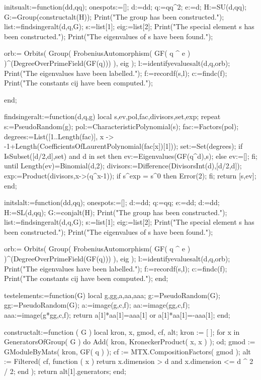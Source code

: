 initsualt:=function(dd,qq);
onespots:=[];
d:=dd;
q:=qq^2;
e:=d;
H:=SU(d,qq);
G:=Group(constructalt(H));
Print("The group has been constructed.\n");
list:=findsingeralt(d,q,G);
s:=list[1]; eig:=list[2];
Print("The special element s has been constructed.\n");
Print("The eigenvalues of s have been found.\n");

orb:= Orbits( Group( FrobeniusAutomorphism( GF( q ^ e ) )^(DegreeOverPrimeField(GF(q))) ), eig );
l:=identifyevaluesalt(d,q,orb);
Print("The eigenvalues have been labelled.\n");
f:=recordf(s,l);
c:=findc(f);
Print("The constants cij have been computed.");

end;

findsingeralt:=function(d,q,g)
local s,ev,pol,fac,divisors,set,exp;
repeat 
   s:=PseudoRandom(g);
   pol:=CharacteristicPolynomial(s);
   fac:=Factors(pol);
   degrees:=List([1..Length(fac)],
        x -> -1+Length(CoefficientsOfLaurentPolynomial(fac[x])[1]));
   set:=Set(degrees);
   if IsSubset([d/2,d],set) and d in set then 
      ev:=Eigenvalues(GF(q^d),s);
   else 
      ev:=[];
   fi;  
until Length(ev)=Binomial(d,2);
divisors:=Difference(DivisorsInt(d),[d/2,d]);
exp:=Product(divisors,x->(q^x-1));
if s^exp = s^0 then Error(2); fi;
return [s,ev];
end;


initslalt:=function(dd,qq);
onespots:=[];
d:=dd;
q:=qq;
e:=dd;
d:=dd;
H:=SL(d,qq);
G:=conjalt(H);
Print("The group has been constructed.\n");
list:=findsingeralt(d,q,G);
s:=list[1]; eig:=list[2];
Print("The special element s has been constructed.\n");
Print("The eigenvalues of s have been found.\n");

orb:= Orbits( Group( FrobeniusAutomorphism( GF( q ^ e ) )^(DegreeOverPrimeField(GF(q))) ), eig );
l:=identifyevaluesalt(d,q,orb);
Print("The eigenvalues have been labelled.\n");
f:=recordf(s,l);
c:=findc(f);
Print("The constants cij have been computed.");
end;

testelements:=function(G) local g,gg,a,aa,aaa;
g:=PseudoRandom(G);
gg:=PseudoRandom(G);
a:=image(g,c,f);
aa:=image(gg,c,f);
aaa:=image(g*gg,c,f);
return a[1]*aa[1]=aaa[1] or a[1]*aa[1]=-aaa[1];
end;

constructalt:=function ( G )
    local  kron, x, gmod, cf, alt;
    kron := [  ];
    for x  in GeneratorsOfGroup( G )  do
        Add( kron, KroneckerProduct( x, x ) );
    od;
    gmod := GModuleByMats( kron, GF( q ) );
    cf := MTX.CompositionFactors( gmod );
    alt := Filtered( cf, function ( x )
            return x.dimension > d and x.dimension <= d ^ 2 / 2;
        end );
    return alt[1].generators;
end;

